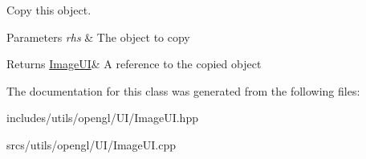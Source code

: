 Copy this object. 


\begin{DoxyParams}{Parameters}
{\em rhs} & The object to copy \\
\hline
\end{DoxyParams}
\begin{DoxyReturn}{Returns}
\hyperlink{class_image_u_i}{Image\+UI}\& A reference to the copied object 
\end{DoxyReturn}


The documentation for this class was generated from the following files\+:\begin{DoxyCompactItemize}
\item 
includes/utils/opengl/\+U\+I/Image\+U\+I.\+hpp\item 
srcs/utils/opengl/\+U\+I/Image\+U\+I.\+cpp\end{DoxyCompactItemize}
